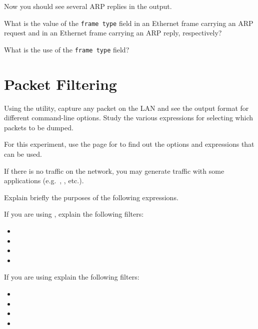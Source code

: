 \documentclass{../UTNetLab}
\begin{document}
Now you should see several ARP replies in the  output.

\begin{report}
    \item What is the value of the \texttt{frame type} field in an Ethernet frame carrying an ARP request and in an Ethernet frame carrying an ARP reply, respectively?

    \item What is the use of the \texttt{frame type} field?
\end{report}

\section{Packet Filtering}
Using the  utility, capture any packet on the LAN and see the output format
for different command-line options.
Study the various expressions for selecting
which packets to be dumped.

For this experiment, use the  page for  to find out the options and
expressions that can be used.

If there is no traffic on the network, you may generate traffic with some applications
(e.g.\ , , etc.).

\begin{report}
    \item Explain briefly the purposes of the following  expressions.
\end{report}

If you are using , explain the following filters:
\begin{itemize}
    \item {}
    \item {}
    \item {}
    \item {}
\end{itemize}

If you are using  explain the following filters:
\begin{itemize}
    \item {}
    \item {}
    \item {}
    \item {}
\end{itemize}
\end{document}

